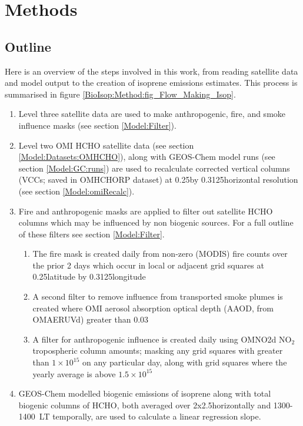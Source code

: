 \section{Methods}
  \label{BioIsop:Method}
  
  \subsection{Outline}
    Here is an overview of the steps involved in this work, from reading satellite data and model output to the creation of isoprene emissions estimates.
    This process is summarised in figure \ref{BioIsop:Method:fig_Flow_Making_Isop}.
    \begin{enumerate}
      \item 
        Level three satellite data are used to make anthropogenic, fire, and smoke influence masks (see section \ref{Model:Filter}).
      \item 
        Level two OMI HCHO satellite data (see section \ref{Model:Datasets:OMHCHO}), along with GEOS-Chem model runs (see section \ref{Model:GC:runs}) are used to recalculate corrected vertical columns (VCCs; saved in OMHCHORP dataset) at 0.25\degr by 0.3125\degr horizontal resolution (see section \ref{Model:omiRecalc}).
      \item 
        Fire and anthropogenic masks are applied to filter out satellite HCHO columns which may be influenced by non biogenic sources.
        For a full outline of these filters see section \ref{Model:Filter}.
      \begin{enumerate}
        \item 
          The fire mask is created daily from non-zero (MODIS) fire counts over the prior 2 days which occur in local or adjacent grid squares at 0.25\degr latitude by 0.3125\degr longitude
        \item 
          A second filter to remove influence from transported smoke plumes is created where OMI aerosol absorption optical depth (AAOD, from OMAERUVd) greater than 0.03
        \item 
          A filter for anthropogenic influence is created daily using OMNO2d NO$_2$ tropospheric column amounts; masking any grid squares with greater than $1\times 10 ^{15}$ on any particular day, along with grid squares where the yearly average is above $1.5 \times 10^{15}$\moleccm
      \end{enumerate}
      \item 
      GEOS-Chem modelled biogenic emissions of isoprene along with total biogenic columns of HCHO, both averaged over 2x2.5\degr horizontally  and 1300-1400~LT temporally, are used to calculate a linear regression slope.

\end{enumerate}
